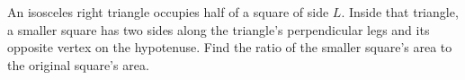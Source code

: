 An isosceles right triangle occupies half of a square of side $L$. Inside that triangle, a smaller square has two sides along the triangle's perpendicular legs and its opposite vertex on the hypotenuse. Find the ratio of the smaller square's area to the original square's area.
